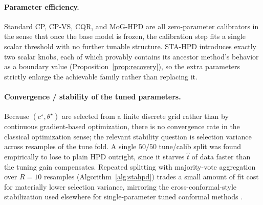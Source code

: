 \documentclass[10pt,twocolumn,a4paper]{article}
\begin{document}
\paragraph{Parameter efficiency.} Standard CP, CP-VS, CQR, and MoG-HPD are all zero-parameter
calibrators in the sense that once the base model is frozen, the calibration step fits a single
scalar threshold with no further tunable structure. STA-HPD introduces exactly two scalar knobs,
each of which provably contains its ancestor method's behavior as a boundary value
(Proposition~\ref{prop:recovery}), so the extra parameters strictly enlarge the achievable family
rather than replacing it.

\paragraph{Convergence / stability of the tuned parameters.} Because $(c^\star,\theta^\star)$ are
selected from a finite discrete grid rather than by continuous gradient-based optimization, there is
no convergence rate in the classical optimization sense; the relevant stability question is
selection variance across resamples of the tune fold. A single $50/50$ tune/calib split was found
empirically to lose to plain HPD outright, since it starves $\hat t$ of data faster than the tuning
gain compensates. Repeated splitting with majority-vote aggregation over $R=10$ resamples
(Algorithm~\ref{alg:stahpd}) trades a small amount of fit cost for materially lower selection
variance, mirroring the cross-conformal-style stabilization used elsewhere for single-parameter
tuned conformal methods \cite{gibbs2021adaptive,tibshirani2019conformal}.
\end{document}

